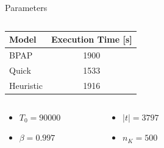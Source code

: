 \documentclass[aspectratio=169,dvipsnames]{beamer}
\begin{document}
\begin{frame}[label={sec:org0c50d7f}]{Parameters}
\begin{columns}
\begin{column}{0.5\columnwidth}

\begin{center}
\begin{tabular}{l|c}
\hline
\alert{Model} & \alert{Execution Time} [s]\\[0pt]
\hline
BPAP & 1900\\[0pt]
Quick & 1533\\[0pt]
Heuristic & 1916\\[0pt]
\hline
\end{tabular}
\end{center}

\begin{columns}
\begin{column}{0.5\columnwidth}
\begin{itemize}
\item \(T_0 = 90000\)
\item \(\beta = 0.997\)
\end{itemize}
\end{column}

\begin{column}{0.5\columnwidth}
\begin{itemize}
\item \(|t| = 3797\)
\item \(n_K = 500\)
\end{itemize}
\end{column}
\end{columns}
\end{column}

\begin{column}{0.5\columnwidth}
\begin{figure}
    \centering
\end{figure}
\end{column}
\end{columns}
\end{frame}
\end{document}
